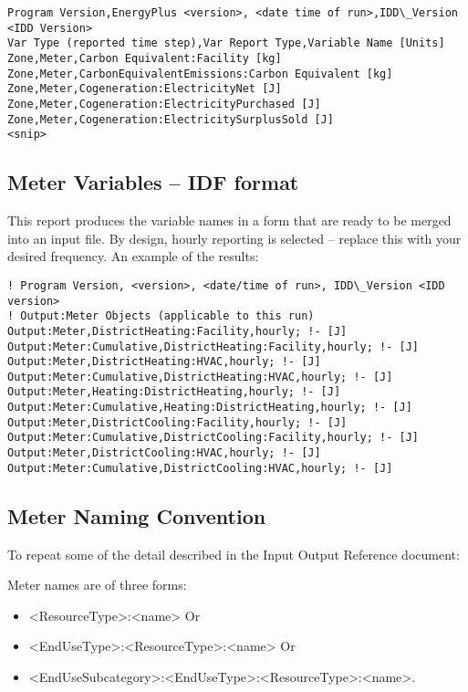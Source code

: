 \begin{lstlisting}
Program Version,EnergyPlus <version>, <date time of run>,IDD\_Version <IDD Version>
Var Type (reported time step),Var Report Type,Variable Name [Units]
Zone,Meter,Carbon Equivalent:Facility [kg]
Zone,Meter,CarbonEquivalentEmissions:Carbon Equivalent [kg]
Zone,Meter,Cogeneration:ElectricityNet [J]
Zone,Meter,Cogeneration:ElectricityPurchased [J]
Zone,Meter,Cogeneration:ElectricitySurplusSold [J]
<snip>
\end{lstlisting}

\subsection{Meter Variables – IDF format}

This report produces the variable names in a form that are ready to be merged into an input file. By design, hourly reporting is selected – replace this with your desired frequency. An example of the results:

\begin{lstlisting}
! Program Version, <version>, <date/time of run>, IDD\_Version <IDD version>
! Output:Meter Objects (applicable to this run)
Output:Meter,DistrictHeating:Facility,hourly; !- [J]
Output:Meter:Cumulative,DistrictHeating:Facility,hourly; !- [J]
Output:Meter,DistrictHeating:HVAC,hourly; !- [J]
Output:Meter:Cumulative,DistrictHeating:HVAC,hourly; !- [J]
Output:Meter,Heating:DistrictHeating,hourly; !- [J]
Output:Meter:Cumulative,Heating:DistrictHeating,hourly; !- [J]
Output:Meter,DistrictCooling:Facility,hourly; !- [J]
Output:Meter:Cumulative,DistrictCooling:Facility,hourly; !- [J]
Output:Meter,DistrictCooling:HVAC,hourly; !- [J]
Output:Meter:Cumulative,DistrictCooling:HVAC,hourly; !- [J]
\end{lstlisting}

\subsection{Meter Naming Convention}

To repeat some of the detail described in the Input Output Reference document:

Meter names are of three forms:

\begin{itemize}
  \item <ResourceType>:<name> Or
  \item <EndUseType>:<ResourceType>:<name> Or
  \item <EndUseSubcategory>:<EndUseType>:<ResourceType>:<name>.
\end{itemize}

